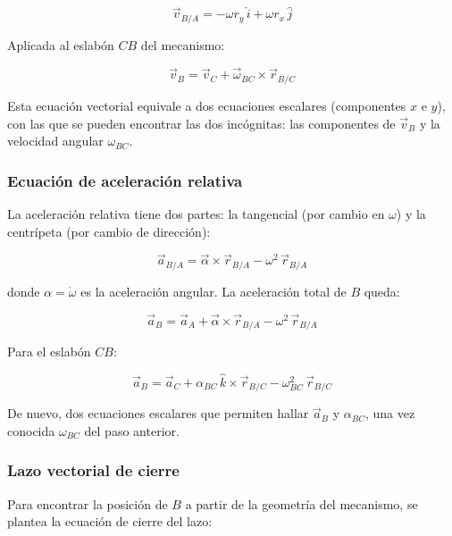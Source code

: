 \begin{equation}
	\vec{v}_{B/A} = -\omega r_y\,\hat{i} + \omega r_x\,\hat{j}
\end{equation}

Aplicada al eslabón $CB$ del mecanismo:

\begin{equation}
	\vec{v}_B = \vec{v}_C + \vec{\omega}_{BC} \times \vec{r}_{B/C}
	\label{eq:vel_eslabon}
\end{equation}

Esta ecuación vectorial equivale a dos ecuaciones escalares (componentes $x$ e $y$), con
las que se pueden encontrar las dos incógnitas: las componentes de $\vec{v}_B$ y la
velocidad angular $\omega_{BC}$.
\\
\subsubsection{Ecuación de aceleración relativa}

La aceleración relativa tiene dos partes: la tangencial (por cambio en $\omega$) y la
centrípeta (por cambio de dirección):

\begin{equation}
	\vec{a}_{B/A} = \vec{\alpha} \times \vec{r}_{B/A} - \omega^2\,\vec{r}_{B/A}
\end{equation}

donde $\alpha = \dot{\omega}$ es la aceleración angular. La aceleración total de $B$ queda:

\begin{equation}
	\vec{a}_B = \vec{a}_A + \vec{\alpha} \times \vec{r}_{B/A} - \omega^2\,\vec{r}_{B/A}
\end{equation}

Para el eslabón $CB$:

\begin{equation}
	\vec{a}_B = \vec{a}_C + \alpha_{BC}\,\hat{k} \times \vec{r}_{B/C}
	- \omega_{BC}^2\,\vec{r}_{B/C}
	\label{eq:acc_eslabon}
\end{equation}

De nuevo, dos ecuaciones escalares que permiten hallar $\vec{a}_B$ y $\alpha_{BC}$,
una vez conocida $\omega_{BC}$ del paso anterior.
\\
\subsubsection{Lazo vectorial de cierre}

Para encontrar la posición de $B$ a partir de la geometría del mecanismo, se plantea
la ecuación de cierre del lazo:

